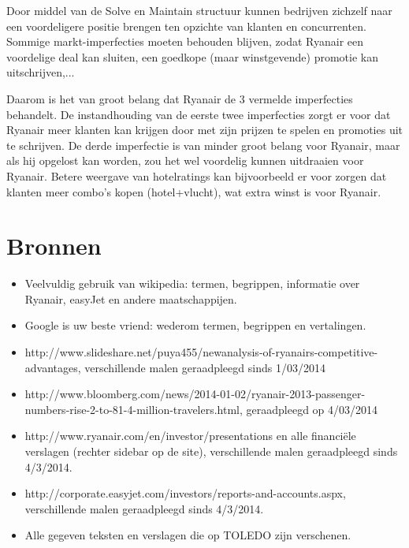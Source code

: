 \documentclass{article}
\begin{document}
Door middel van de Solve en Maintain structuur kunnen bedrijven zichzelf naar een voordeligere positie brengen ten opzichte van klanten en concurrenten. Sommige markt-imperfecties moeten behouden blijven, zodat Ryanair een voordelige deal kan sluiten, een goedkope (maar winstgevende) promotie kan uitschrijven,...

Daarom is het van groot belang dat Ryanair de 3 vermelde imperfecties behandelt. De instandhouding van de eerste twee imperfecties zorgt er voor dat Ryanair meer klanten kan krijgen door met zijn prijzen te spelen en promoties uit te schrijven. De derde imperfectie is van minder groot belang voor Ryanair, maar als hij opgelost kan worden, zou het wel voordelig kunnen uitdraaien voor Ryanair. Betere weergave van hotelratings kan bijvoorbeeld er voor zorgen dat klanten meer combo's kopen (hotel+vlucht), wat extra winst is voor Ryanair.

\newpage
\part{Bronnen}
\begin{itemize}
\item Veelvuldig gebruik van wikipedia: termen, begrippen, informatie over Ryanair, easyJet en andere maatschappijen.
\item Google is uw beste vriend: wederom termen, begrippen en vertalingen.
\item http://www.slideshare.net/puya455/newanalysis-of-ryanairs-competitive-\\advantages, verschillende malen geraadpleegd sinds 1/03/2014
\item http://www.bloomberg.com/news/2014-01-02/ryanair-2013-passenger-\\numbers-rise-2-to-81-4-million-travelers.html, geraadpleegd op 4/03/2014
\item http://www.ryanair.com/en/investor/presentations en alle financi\"ele verslagen (rechter sidebar op de site), verschillende malen geraadpleegd sinds 4/3/2014.
\item http://corporate.easyjet.com/investors/reports-and-accounts.aspx, \\verschillende malen geraadpleegd sinds 4/3/2014.
\item Alle gegeven teksten en verslagen die op TOLEDO zijn verschenen. 
\end{itemize}
\end{document}
